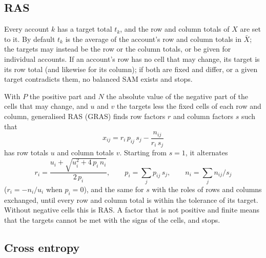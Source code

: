 \subsection{RAS}\label{sec:ras}

Every account $k$ has a target total $t_k$, and the row and column totals of
$X$ are set to it. By default $t_k$ is the average of the account's row and
column totals in $\bar X$; the targets may instead be the row or the column
totals, or be given for individual accounts. If an account's row has no cell
that may change, its target is its row total (and likewise for its column); if
both are fixed and differ, or a given target contradicts them, no balanced SAM
exists and  stops.

With $P$ the positive part and $N$ the absolute value of the negative part of
the cells that may change, and $u$ and $v$ the targets less the fixed cells of
each row and column, generalised RAS (GRAS) finds row factors $r$ and column
factors $s$ such that
\begin{equation*}
x_{ij} = r_i\,p_{ij}\,s_j - \frac{n_{ij}}{r_i\,s_j}
\end{equation*}
has row totals $u$ and column totals $v$. Starting from $s = 1$, it alternates
\begin{equation*}
r_i = \frac{u_i + \sqrt{u_i^2 + 4\,p_i\,n_i}}{2\,p_i}, \qquad
p_i = \sum_j p_{ij}\,s_j, \qquad n_i = \sum_j n_{ij} / s_j
\end{equation*}
($r_i = -n_i / u_i$ when $p_i = 0$), and the same for $s$ with the roles of rows
and columns exchanged, until every row and column total is within the
tolerance of its target. Without negative cells this is RAS. A factor that is
not positive and finite means that the targets cannot be met with the signs of
the cells, and  stops.

\subsection{Cross entropy}\label{sec:ce}

